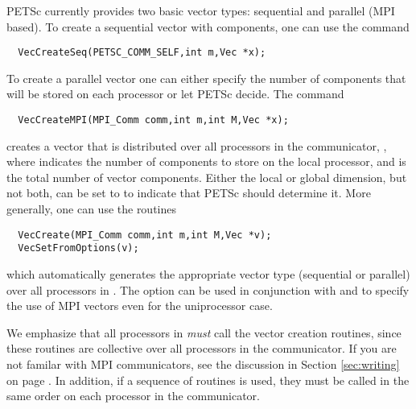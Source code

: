 PETSc currently provides two basic vector types: sequential and parallel
(MPI based). To create a sequential vector with  components,
one can
use the command  
\begin{verbatim}
  VecCreateSeq(PETSC_COMM_SELF,int m,Vec *x);
\end{verbatim}
To create a parallel vector one can either specify the number of 
components that will be stored on each processor or let PETSc decide. 
The command 
\begin{verbatim}
  VecCreateMPI(MPI_Comm comm,int m,int M,Vec *x);
\end{verbatim}
creates a vector that is distributed over all processors in the communicator,
, where  indicates the number 
of components to store on the local processor, and  is the 
total number of vector components.  Either the local or global 
dimension, but not both, can be set to  to 
 indicate that PETSc should determine it.
More generally, one can use the routines  
\begin{verbatim}
  VecCreate(MPI_Comm comm,int m,int M,Vec *v);
  VecSetFromOptions(v);
\end{verbatim}
which automatically generates the appropriate vector type 
(sequential or parallel) over all processors in .
The option   can be used in conjunction with 
 and  to specify the use of MPI 
vectors even for the uniprocessor case.

We emphasize that all processors in  {\em must} call the
vector creation routines, since these routines are collective over all
processors in the communicator. If you are not familar with MPI communicators,
see the discussion in Section \ref{sec:writing} on page \pageref{sec:writing}. 
In addition, if a sequence of  routines is used, they must be called in the same
order on each processor in the communicator.

